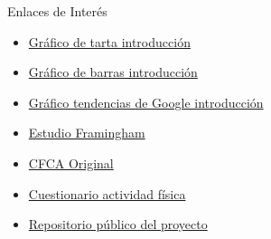 \documentclass[bigger]{beamer}
\begin{document}
\begin{frame}{Enlaces de Interés}
	\begin{itemize}
	\item \href{https://voicebot.ai/2018/04/03/over-half-of-smartphone-owners-use-voice-assistants-siri-leads-the-pack/}{Gráfico de tarta introducción}
	\item \href{https://www.convinceandconvert.com/digital-marketing/6-critical-chatbot-statistics-for-2018/}{Gráfico de barras introducción}
	\item \href{https://chatbotsmagazine.com/chatbot-report-2018-global-trends-and-analysis-4d8bbe4d924b}{Gráfico tendencias de Google introducción}
	\item \href{https://www.nejm.org/doi/full/10.1056/nejme078114}{Estudio Framingham}
	\item \href{http://www.nutricionhospitalaria.com/pdf/4035.pdf}{CFCA Original}
	\item\href{https://youthrex.com/wp-content/uploads/2017/06/IPAQ-TM.pdf}{Cuestionario actividad física}
	\item\href{https://github.com/vblanes/alphahealth}{Repositorio público del proyecto}
	\end{itemize}
\end{frame}
\end{document}
